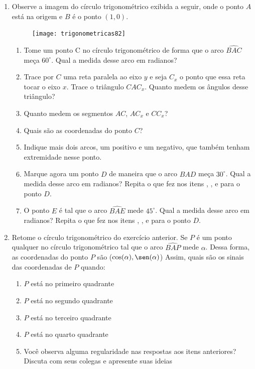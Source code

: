 \begin{enumerate}
\item Observe a imagem do círculo trigonométrico exibida a seguir, onde o ponto $A$ está na origem e $B$ é o ponto $(1,0)$.

\begin{figure}[H]
\centering

\texttt{[image: trigonometricas82]}
\end{figure}

\begin{enumerate}
\item 	Tome um ponto C no círculo trigonométrico de forma que o arco $\widehat{BAC}$ meça $60^{\circ}$. Qual a medida desse arco em radianos?
\item Trace por $C$ uma reta paralela ao eixo $y$ e seja $C_x$ o ponto que essa reta tocar o eixo $x$. Trace o triângulo $CAC_x$. Quanto medem os ângulos desse triângulo?
\item Quanto medem os segmentos $AC$, $AC_x$ e $CC_x$?
\item Quais são as coordenadas do ponto $C$?
\item Indique mais dois arcos, um positivo e um negativo, que também tenham extremidade nesse ponto.
\item Marque agora um ponto $D$ de maneira que o arco $\widehat{BAD}$ meça $30^{\circ}$. Qual a medida desse arco em radianos? Repita o que fez nos itens , ,  e  para o ponto $D$.
\item O ponto $E$ é tal que o arco $\widehat{BAE}$ mede $45^{\circ}$. Qual a medida desse arco em radianos? Repita o que fez nos itens , ,  e  para o ponto $D$.
\end{enumerate}

\item Retome o círculo trigonométrico do exercício anterior. Se $P$ é um ponto qualquer no círculo trigonométrico tal que o arco $\widehat{BAP}$ mede $\alpha$. Dessa forma, as coordenadas do ponto $P$ são ($\cos(\alpha), \sen(\alpha)$) Assim, quais são os sinais das coordenadas de $P$ quando:
\begin{enumerate}
\item $P$ está no primeiro quadrante
\item $P$ está no segundo quadrante
\item $P$ está no terceiro quadrante
\item $P$ está no quarto quadrante
\item Você observa alguma regularidade nas respostas aos itens anteriores? Discuta com seus colegas e apresente suas ideias
\end{enumerate}


\end{enumerate}

